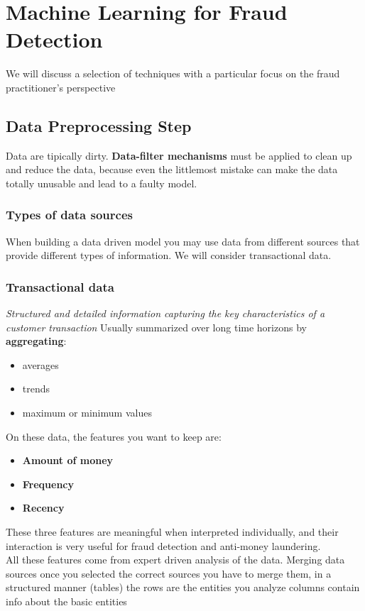 \chapter{Machine Learning for Fraud Detection}
    We will discuss a selection of techniques with a particular focus on the fraud practitioner's perspective
    \section{Data Preprocessing Step}
        Data are tipically dirty. \textbf{Data-filter mechanisms} must be applied to clean up and reduce the data, because even the littlemost mistake can make the data totally unusable and lead to a faulty model.
        \subsection{Types of data sources}
            When building a data driven model you may use data from different sources that provide different types of information. We will consider transactional data.
        \subsection{Transactional data}
            \textit{Structured and detailed information capturing the key characteristics of a customer transaction}
            Usually summarized over long time horizons by \textbf{aggregating}:
            \begin{itemize}
                \item averages
                \item trends 
                \item maximum or minimum values
            \end{itemize}
            On these data, the features you want to keep are:
            \begin{itemize}
                \item \textbf{Amount of money}
                \item \textbf{Frequency}
                \item \textbf{Recency}
            \end{itemize}
            These three features are meaningful when interpreted individually, and their interaction is very useful for fraud detection and anti-money laundering.\\
            All these features come from expert driven analysis of the data.
\iffalse
            Merging data sources 
                once you selected the correct sources you have to merge them, in a structured manner (tables) 
                    the rows are the entities you analyze
                    columns contain info about the basic entities

